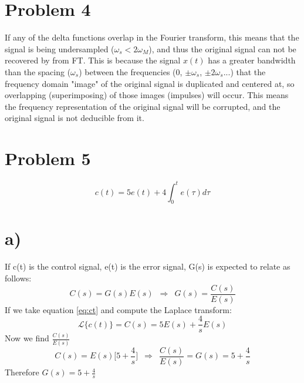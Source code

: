 \documentclass[12pt,letterpaper]{article}
\begin{document}
\section{Problem 4}
If any of the delta functions overlap in the Fourier transform, this means that the signal is being undersampled ($\omega_s < 2\omega_{M} $), and thus the original signal can not be recovered by from FT. This is because the signal $x(t)$ has a greater bandwidth than the spacing ($\omega_s$) between the frequencies (0, $\pm\omega_s$, $\pm2\omega_s$...) that the frequency domain "image" of the original signal is duplicated and centered at, so overlapping (superimposing) of those images (impulses) will occur. This means the frequency representation of the original signal will be corrupted, and the original signal is not deducible from it.\\\par
\section{Problem 5}
\begin{equation}
c(t) = 5e(t) + 4\int_0^te(\tau)d\tau
\label{eq:ct}
\end{equation}
\section*{a)}
If c(t) is the control signal, e(t) is the error signal, G(s) is expected to relate as follows:
\begin{equation}
C(s) = G(s)E(s) \hspace{6pt}\Rightarrow \hspace{6pt}G(s) = \frac{C(s)}{E(s)}
\end{equation}
If we take equation \ref{eq:ct} and compute the Laplace transform:
\begin{equation}
\mathcal{L}\{c(t)\} = C(s) = 5E(s) + \frac{4}{s}E(s)
\end{equation}
Now we find $\frac{C(s)}{E(s)}$
\begin{equation}
C(s) = E(s)\bigg[5 + \frac{4}{s}\bigg] \hspace{6pt}\Rightarrow \hspace{6pt} \frac{C(s)}{E(s)} = G(s) = 5 + \frac{4}{s}
\end{equation}
Therefore $G(s) =  5 + \frac{4}{s}$\\
\end{document}
